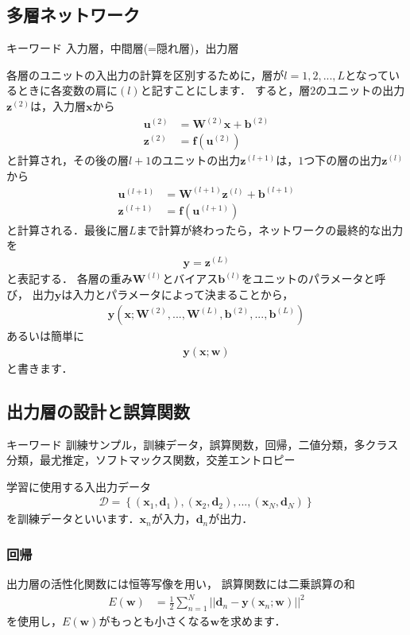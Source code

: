 \documentclass[a4paper,10pt]{jsarticle}
\theoremstyle{definition}
\newcommand{\eq}[1]{\begin{align}#1\end{align}}
\begin{document}
\subsection{多層ネットワーク}
\begin{itembox}[l]{キーワード}
入力層，中間層(=隠れ層)，出力層
\end{itembox}
各層のユニットの入出力の計算を区別するために，層が$l=1,2,...,L$となっているときに各変数の肩に$(l)$と記すことにします．
すると，層$2$のユニットの出力$\mathbf{z}^{(2)}$は，入力層$\mathbf{x}$から
\eq{
	\mathbf{u}^{(2)}&=\mathbf{W}^{(2)}\mathbf{x}+\mathbf{b}^{(2)}\\
	\mathbf{z}^{(2)}&=\mathbf{f}(\mathbf{u}^{(2)})}
と計算され，その後の層$l+1$のユニットの出力$\mathbf{z}^{(l+1)}$は，$1$つ下の層の出力$\mathbf{z}^{(l)}$から
\eq{
	\mathbf{u}^{(l+1)}&=\mathbf{W}^{(l+1)}\mathbf{z}^{(l)}+\mathbf{b}^{(l+1)}\\
	\mathbf{z}^{(l+1)}&=\mathbf{f}(\mathbf{u}^{(l+1)})}
と計算される．最後に層$L$まで計算が終わったら，ネットワークの最終的な出力を
\eq{\mathbf{y}=\mathbf{z}^{(L)}}
と表記する．
各層の重み$\mathbf{W}^{(l)}$とバイアス$\mathbf{b}^{(l)}$をユニットのパラメータと呼び，
出力$\mathbf{y}$は入力とパラメータによって決まることから，
\eq{\mathbf{y}\left(\mathbf{x};\mathbf{W}^{(2)},...,\mathbf{W}^{(L)},\mathbf{b}^{(2)},...,\mathbf{b}^{(L)}\right)}
あるいは簡単に
\eq{\mathbf{y}(\mathbf{x};\mathbf{w})}
と書きます．
%
\subsection{出力層の設計と誤算関数}
\begin{itembox}[l]{キーワード}
訓練サンプル，訓練データ，誤算関数，回帰，二値分類，多クラス分類，最尤推定，ソフトマックス関数，交差エントロピー
\end{itembox}
学習に使用する入出力データ
\eq{\mathcal{D}=\left\{(\mathbf{x}_1,\mathbf{d}_1),(\mathbf{x}_2,\mathbf{d}_2),...,(\mathbf{x}_N,\mathbf{d}_N)\right\}}
を訓練データといいます．$\mathbf{x}_n$が入力，$\mathbf{d}_n$が出力．
%
\subsubsection{回帰}
出力層の活性化関数には恒等写像を用い，
誤算関数には二乗誤算の和
\eq{E(\mathbf{w})&=\frac{1}{2}\sum_{n=1}^N||\mathbf{d}_n-\mathbf{y}(\mathbf{x}_n;\mathbf{w})||^2}
を使用し，$E(\mathbf{w})$がもっとも小さくなる$\mathbf{w}$を求めます．
%
\end{document}
